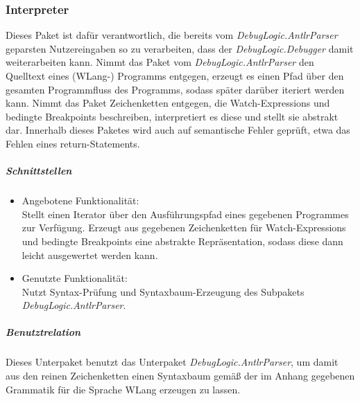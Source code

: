 \documentclass[parskip=full]{scrartcl}
\begin{document}
\subsubsection{Interpreter}
Dieses Paket ist dafür verantwortlich, die bereits vom \textit{DebugLogic.AntlrParser}  geparsten Nutzereingaben so zu verarbeiten, dass der \textit{DebugLogic.Debugger} damit weiterarbeiten kann. Nimmt das Paket vom \textit{DebugLogic.AntlrParser} den Quelltext eines (WLang-) Programms entgegen, erzeugt es einen Pfad über den gesamten Programmfluss des Programms, sodass später darüber iteriert werden kann. Nimmt das Paket Zeichenketten entgegen, die Watch-Expressions und bedingte Breakpoints beschreiben, interpretiert es diese und stellt sie abstrakt dar.
Innerhalb dieses Paketes wird auch auf semantische Fehler geprüft, etwa das Fehlen eines return-Statements.


\subparagraph{Schnittstellen}
\begin{itemize}
\item Angebotene Funktionalität:\\
Stellt einen Iterator über den Ausführungspfad eines gegebenen Programmes zur Verfügung. Erzeugt aus gegebenen Zeichenketten für Watch-Expressions und bedingte Breakpoints eine abstrakte Repräsentation, sodass diese dann leicht ausgewertet werden kann.

\item Genutzte Funktionalität:\\
Nutzt Syntax-Prüfung und Syntaxbaum-Erzeugung des Subpakets \textit{DebugLogic.AntlrParser}. 
\end{itemize}

\subparagraph{Benutztrelation} 
Dieses Unterpaket benutzt das Unterpaket \textit{DebugLogic.AntlrParser}, um damit aus den reinen Zeichenketten einen Syntaxbaum gemäß der im Anhang gegebenen Grammatik für die Sprache WLang erzeugen zu lassen.
\end{document}
